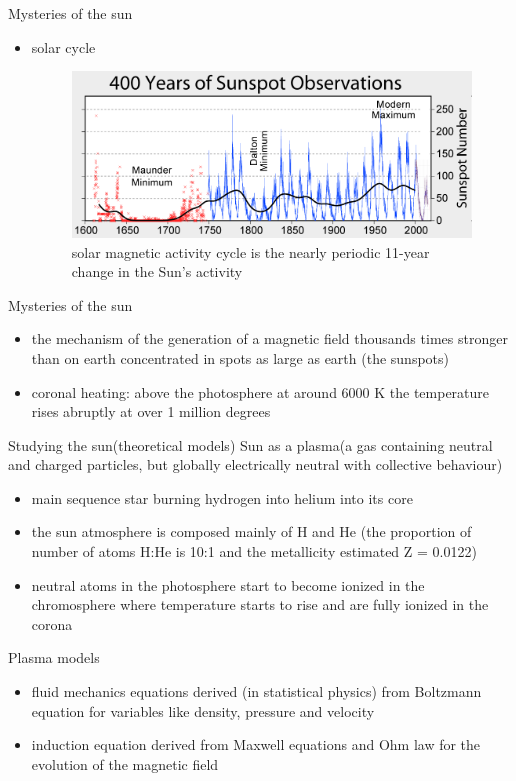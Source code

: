 \documentclass{beamer}
\begin{document}
\begin{frame}{Mysteries of the sun}
\begin{itemize}
\item solar cycle
\begin{figure}[H]
 \centering
 \includegraphics[scale=0.4]{cycle.png}
  \caption{solar magnetic activity cycle is the nearly periodic 11-year change in the Sun's activity}
\end{figure}
\end{itemize}
\end{frame}



\begin{frame}{Mysteries of the sun}

\begin{itemize}
\item the mechanism of the generation of 
a magnetic field thousands times stronger 
than on earth concentrated in spots as large as earth (the sunspots)
\item coronal heating: above the photosphere at around 6000 K the temperature rises abruptly at over 1 million degrees 
\end{itemize}

\end{frame}


\begin{frame}{Studying the sun(theoretical models)}
Sun as a plasma(a gas containing neutral and charged particles, but globally electrically neutral with collective behaviour)
\begin{itemize}
\item main sequence star burning hydrogen into helium into its core
\item the sun atmosphere is composed mainly of H and He (the proportion of number of atoms H:He is 10:1 and the metallicity estimated Z = 0.0122)
\item neutral atoms in the photosphere  start to become ionized in the chromosphere where temperature starts to rise and  
are fully ionized in the corona  
\end{itemize}
Plasma models
\begin{itemize}
\item fluid mechanics equations derived (in statistical physics) from Boltzmann equation 
for variables like density, pressure and velocity
\item induction equation derived from Maxwell equations and Ohm law for the evolution of the magnetic field
\end{itemize}

\end{frame}
\end{document}
